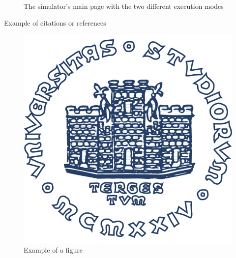 \begin{figure}[H]
	\centering
	
	\caption{The simulator's main page with the two different execution modes}
\end{figure}


Example of citations or references~\cite{einstein}\cite{latexcompanion}

\begin{figure}[h!]\label{fig:example}
\centering
\includegraphics[width=.8\textwidth]{img/units_logo.png}
\caption{Example of a figure}
\end{figure}

